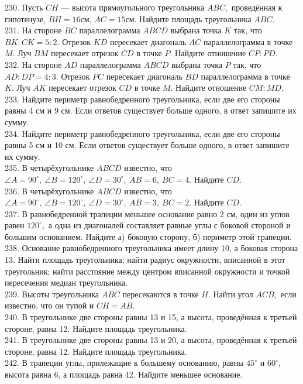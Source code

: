 230. Пусть $CH$ --- высота прямоугольного треугольника $ABC,$ проведённая к гипотенузе, $BH=16$см, $AC=15$см. Найдите площадь треугольника $ABC.$\\
231. На стороне $BC$ параллелограмма $ABCD$ выбрана точка $K$ так, что $BK:CK=5:2.$ Отрезок $KD$ пересекает диагональ $AC$ параллелограмма в точке $M.$ Луч $BM$ пересекает отрезок $CD$ в точке $P.$ Найдите отношение $CP:PD.$\\
232. На стороне $AD$ параллелограмма $ABCD$ выбрана точка $P$ так, что $AD:DP=4:3.$ Отрезок $PC$ пересекает диагональ $BD$ параллелограмма в точке $K.$ Луч $AK$ пересекает отрезок $CD$ в точке $M.$ Найдите отношение $CM:MD.$\\
233. Найдите периметр равнобедренного треугольника, если две его стороны равны 4 см и 9 см. Если ответов существует больше одного, в ответ запишите их сумму.\\
234. Найдите периметр равнобедренного треугольника, если две его стороны равны 5 см и 10 см. Если ответов существует больше одного, в ответ запишите их сумму.\\
235. В четырёхугольнике $ABCD$ известно, что $\angle A=90^\circ,\ \angle B=120^\circ,\ \angle D=30^\circ,\ AB=6,\ BC=4.$ Найдите $CD.$\\
236. В четырёхугольнике $ABCD$ известно, что $\angle A=90^\circ,\ \angle B=120^\circ,\ \angle D=30^\circ,\ AB=3,\ BC=2.$ Найдите $CD.$\\
237. В равнобедренной трапеции меньшее основание равно 2 см, один из углов равен $120^\circ,$ а одна из диагоналей составляет равные углы с боковой стороной и большим основанием. Найдите а) боковую сторону, б) периметр этой трапеции.\\
238. Основание равнобедренного треугольника имеет длину 10, а боковая сторона 13. Найти площадь треугольника; найти радиус окружности, вписанной в этот треугольник; найти расстояние между центром вписанной окружности и точкой пересечения медиан треугольника.\\
239. Высоты треугольника $ABC$ пересекаются в точке $H.$ Найти угол $ACB,$ если известно, что он тупой и $CH=AB.$\\
240. В треугольнике две стороны равны 13 и 15, а высота, проведённая к третьей стороне, равна 12. Найдите площадь треугольника.\\
241. В треугольнике две стороны равны 13 и 20, а высота, проведённая к третьей стороне, равна 12. Найдите площадь треугольника.\\
242. В трапеции углы, прилежащие к большему основанию, равны $45^\circ$ и $60^\circ,$ высота равна 6, а площадь равна 42. Найдите меньшее основание.\\
